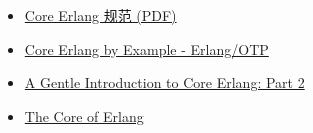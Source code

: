 \begin{itemize}[leftmargin=1.5em]
    \item \href{https://www.it.uu.se/research/group/hipe/cerl/doc/core_erlang-1.0.3.pdf}{Core Erlang 规范 (PDF)}
    \item \href{https://www.erlang.org/blog/core-erlang-by-example/}{Core Erlang by Example - Erlang/OTP}
    \item \href{https://baha.github.io/intro-core-erlang-2/}{A Gentle Introduction to Core Erlang: Part 2}
    \item \href{https://8thlight.com/insights/the-core-of-erlang}{The Core of Erlang}
\end{itemize}
